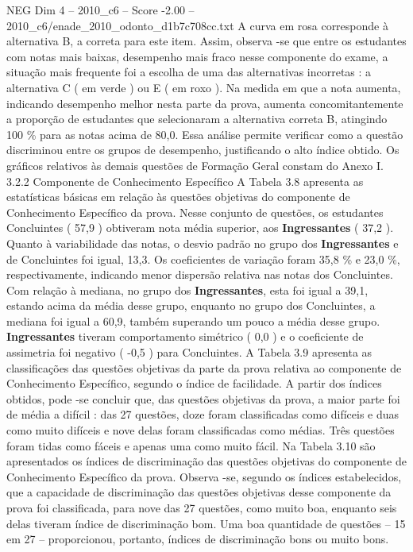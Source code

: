 \begin{textsample}{NEG Dim 4 – 2010\_c6 – Score -2.00 – 2010\_c6/enade\_2010\_odonto\_d1b7c708cc.txt}
A curva em rosa corresponde à alternativa B, a correta para este item.
Assim, observa -se que entre os estudantes com notas mais baixas, desempenho mais fraco nesse componente do exame, a situação mais frequente foi a escolha de uma das alternativas incorretas : a alternativa C ( em verde ) ou E ( em roxo ).
Na medida em que a nota aumenta, indicando desempenho melhor nesta parte da prova, aumenta concomitantemente a proporção de estudantes que selecionaram a alternativa correta B, atingindo 100 \% para as notas acima de 80,0.
Essa análise permite verificar como a questão discriminou entre os grupos de desempenho, justificando o alto índice obtido.
Os gráficos relativos às demais questões de Formação Geral constam do Anexo I. 3.2.2 Componente de Conhecimento Específico A Tabela 3.8 apresenta as estatísticas básicas em relação às questões objetivas do componente de Conhecimento Específico da prova.
Nesse conjunto de questões, os estudantes Concluintes ( 57,9 ) obtiveram nota média superior, aos \textbf{Ingressantes} ( 37,2 ).
Quanto à variabilidade das notas, o desvio padrão no grupo dos \textbf{Ingressantes} e de Concluintes foi igual, 13,3.
Os coeficientes de variação foram 35,8 \% e 23,0 \%, respectivamente, indicando menor dispersão relativa nas notas dos Concluintes.
Com relação à mediana, no grupo dos \textbf{Ingressantes}, esta foi igual a 39,1, estando acima da média desse grupo, enquanto no grupo dos Concluintes, a mediana foi igual a 60,9, também superando um pouco a média desse grupo. \textbf{Ingressantes} tiveram comportamento simétrico ( 0,0 ) e o coeficiente de assimetria foi negativo ( -0,5 ) para Concluintes.
A Tabela 3.9 apresenta as classificações das questões objetivas da parte da prova relativa ao componente de Conhecimento Específico, segundo o índice de facilidade.
A partir dos índices obtidos, pode -se concluir que, das questões objetivas da prova, a maior parte foi de média a difícil : das 27 questões, doze foram classificadas como difíceis e duas como muito difíceis e nove delas foram classificadas como médias.
Três questões foram tidas como fáceis e apenas uma como muito fácil.
Na Tabela 3.10 são apresentados os índices de discriminação das questões objetivas do componente de Conhecimento Específico da prova.
Observa -se, segundo os índices estabelecidos, que a capacidade de discriminação das questões objetivas desse componente da prova foi classificada, para nove das 27 questões, como muito boa, enquanto seis delas tiveram índice de discriminação bom.
Uma boa quantidade de questões – 15 em 27 – proporcionou, portanto, índices de discriminação bons ou muito bons.

\end{textsample}
